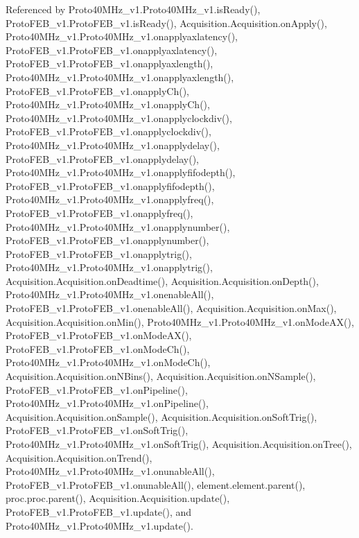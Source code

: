 Referenced by Proto40\+M\+Hz\+\_\+v1.\+Proto40\+M\+Hz\+\_\+v1.\+is\+Ready(), Proto\+F\+E\+B\+\_\+v1.\+Proto\+F\+E\+B\+\_\+v1.\+is\+Ready(), Acquisition.\+Acquisition.\+on\+Apply(), Proto40\+M\+Hz\+\_\+v1.\+Proto40\+M\+Hz\+\_\+v1.\+onapplyaxlatency(), Proto\+F\+E\+B\+\_\+v1.\+Proto\+F\+E\+B\+\_\+v1.\+onapplyaxlatency(), Proto\+F\+E\+B\+\_\+v1.\+Proto\+F\+E\+B\+\_\+v1.\+onapplyaxlength(), Proto40\+M\+Hz\+\_\+v1.\+Proto40\+M\+Hz\+\_\+v1.\+onapplyaxlength(), Proto\+F\+E\+B\+\_\+v1.\+Proto\+F\+E\+B\+\_\+v1.\+onapply\+Ch(), Proto40\+M\+Hz\+\_\+v1.\+Proto40\+M\+Hz\+\_\+v1.\+onapply\+Ch(), Proto40\+M\+Hz\+\_\+v1.\+Proto40\+M\+Hz\+\_\+v1.\+onapplyclockdiv(), Proto\+F\+E\+B\+\_\+v1.\+Proto\+F\+E\+B\+\_\+v1.\+onapplyclockdiv(), Proto40\+M\+Hz\+\_\+v1.\+Proto40\+M\+Hz\+\_\+v1.\+onapplydelay(), Proto\+F\+E\+B\+\_\+v1.\+Proto\+F\+E\+B\+\_\+v1.\+onapplydelay(), Proto40\+M\+Hz\+\_\+v1.\+Proto40\+M\+Hz\+\_\+v1.\+onapplyfifodepth(), Proto\+F\+E\+B\+\_\+v1.\+Proto\+F\+E\+B\+\_\+v1.\+onapplyfifodepth(), Proto40\+M\+Hz\+\_\+v1.\+Proto40\+M\+Hz\+\_\+v1.\+onapplyfreq(), Proto\+F\+E\+B\+\_\+v1.\+Proto\+F\+E\+B\+\_\+v1.\+onapplyfreq(), Proto40\+M\+Hz\+\_\+v1.\+Proto40\+M\+Hz\+\_\+v1.\+onapplynumber(), Proto\+F\+E\+B\+\_\+v1.\+Proto\+F\+E\+B\+\_\+v1.\+onapplynumber(), Proto\+F\+E\+B\+\_\+v1.\+Proto\+F\+E\+B\+\_\+v1.\+onapplytrig(), Proto40\+M\+Hz\+\_\+v1.\+Proto40\+M\+Hz\+\_\+v1.\+onapplytrig(), Acquisition.\+Acquisition.\+on\+Deadtime(), Acquisition.\+Acquisition.\+on\+Depth(), Proto40\+M\+Hz\+\_\+v1.\+Proto40\+M\+Hz\+\_\+v1.\+onenable\+All(), Proto\+F\+E\+B\+\_\+v1.\+Proto\+F\+E\+B\+\_\+v1.\+onenable\+All(), Acquisition.\+Acquisition.\+on\+Max(), Acquisition.\+Acquisition.\+on\+Min(), Proto40\+M\+Hz\+\_\+v1.\+Proto40\+M\+Hz\+\_\+v1.\+on\+Mode\+A\+X(), Proto\+F\+E\+B\+\_\+v1.\+Proto\+F\+E\+B\+\_\+v1.\+on\+Mode\+A\+X(), Proto\+F\+E\+B\+\_\+v1.\+Proto\+F\+E\+B\+\_\+v1.\+on\+Mode\+Ch(), Proto40\+M\+Hz\+\_\+v1.\+Proto40\+M\+Hz\+\_\+v1.\+on\+Mode\+Ch(), Acquisition.\+Acquisition.\+on\+N\+Bins(), Acquisition.\+Acquisition.\+on\+N\+Sample(), Proto\+F\+E\+B\+\_\+v1.\+Proto\+F\+E\+B\+\_\+v1.\+on\+Pipeline(), Proto40\+M\+Hz\+\_\+v1.\+Proto40\+M\+Hz\+\_\+v1.\+on\+Pipeline(), Acquisition.\+Acquisition.\+on\+Sample(), Acquisition.\+Acquisition.\+on\+Soft\+Trig(), Proto\+F\+E\+B\+\_\+v1.\+Proto\+F\+E\+B\+\_\+v1.\+on\+Soft\+Trig(), Proto40\+M\+Hz\+\_\+v1.\+Proto40\+M\+Hz\+\_\+v1.\+on\+Soft\+Trig(), Acquisition.\+Acquisition.\+on\+Tree(), Acquisition.\+Acquisition.\+on\+Trend(), Proto40\+M\+Hz\+\_\+v1.\+Proto40\+M\+Hz\+\_\+v1.\+onunable\+All(), Proto\+F\+E\+B\+\_\+v1.\+Proto\+F\+E\+B\+\_\+v1.\+onunable\+All(), element.\+element.\+parent(), proc.\+proc.\+parent(), Acquisition.\+Acquisition.\+update(), Proto\+F\+E\+B\+\_\+v1.\+Proto\+F\+E\+B\+\_\+v1.\+update(), and Proto40\+M\+Hz\+\_\+v1.\+Proto40\+M\+Hz\+\_\+v1.\+update().


